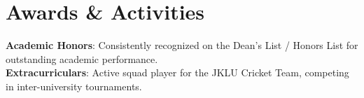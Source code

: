 \documentclass[letterpaper,11pt]{article}
\begin{document}
\section{Awards \& Activities}
 \begin{itemize}[leftmargin=0.15in, label={}]
    \small{\item{
     \textbf{Academic Honors}{: Consistently recognized on the Dean's List / Honors List for outstanding academic performance.} \\
     \textbf{Extracurriculars}{: Active squad player for the JKLU Cricket Team, competing in inter-university tournaments.}
    }}
 \end{itemize}
\end{document}
